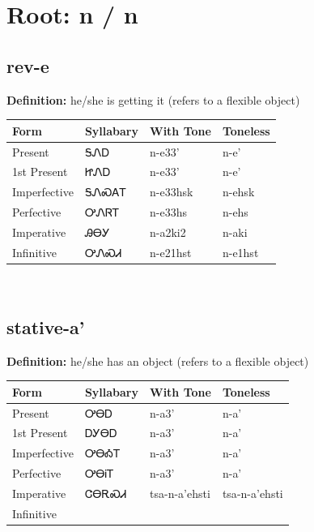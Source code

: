\documentclass{article}%
\begin{document}
%
\normalsize%
\section*{Root: n / n}%
\subsection*{rev-e}%
\textbf{Definition: }%
he/she is getting it (refers to a flexible object)%
\\[0.5em]%
\begin{tabular}{|l|l|l|l|}%
\hline%
\textbf{Form}&\textbf{Syllabary}&\textbf{With Tone}&\textbf{Toneless}\\%
\hline%
Present&ᎦᏁᎠ&n{-}e33'&n{-}e'\\%
1st Present&ᏥᏁᎠ&n{-}e33'&n{-}e'\\%
Imperfective&ᎦᏁᏍᎪᎢ&n{-}e33hsk&n{-}ehsk\\%
Perfective&ᎤᏁᏒᎢ&n{-}e33hs&n{-}ehs\\%
Imperative&ᎯᎾᎩ&n{-}a2ki2&n{-}aki\\%
Infinitive&ᎤᏁᏍᏗ&n{-}e21hst&n{-}e1hst\\%
\hline%
\end{tabular}%
\\[1em]%
\subsection*{stative-a'}%
\textbf{Definition: }%
he/she has an object (refers to a flexible object)%
\\[0.5em]%
\begin{tabular}{|l|l|l|l|}%
\hline%
\textbf{Form}&\textbf{Syllabary}&\textbf{With Tone}&\textbf{Toneless}\\%
\hline%
Present&ᎤᎾᎠ&n{-}a3'&n{-}a'\\%
1st Present&ᎠᎩᎾᎠ&n{-}a3'&n{-}a'\\%
Imperfective&ᎤᎾᎣᎢ&n{-}a3'&n{-}a'\\%
Perfective&ᎤᎾᎥᎢ&n{-}a3'&n{-}a'\\%
Imperative&ᏣᎾᎡᏍᏗ&tsa{-}n{-}a'ehsti&tsa{-}n{-}a'ehsti\\%
Infinitive&&&\\%
\hline%
\end{tabular}%
\\[1em]%
\end{document}
